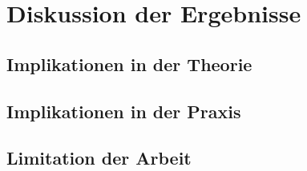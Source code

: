 \chapter{Diskussion der Ergebnisse} %
\label{Discussion} %

\section{Implikationen in der Theorie}

\section{Implikationen in der Praxis}

\section{Limitation der Arbeit}